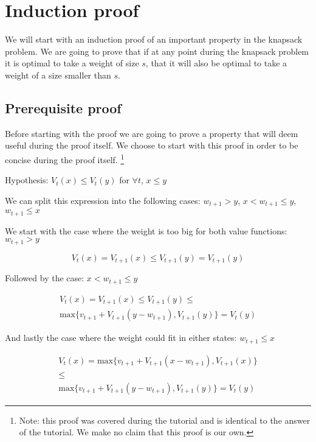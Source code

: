 \documentclass[nonacm,sigconf]{acmart}
\begin{document}
\section{Induction proof}

We will start with an induction proof of an important property
in the knapsack problem. We are going to prove that if at any
point during the knapsack problem it is optimal to take a weight
of size $s$, that it will also be optimal to take a weight of a
size smaller than $s$.

\subsection{Prerequisite proof}

Before starting with the proof we are going to prove a property that will deem
useful during the proof itself. We choose to start with this proof in order to
be concise during the proof itself. \footnote{Note: this proof was covered during the
tutorial and is identical to the answer of the tutorial. We make no claim that
this proof is our own.}

Hypothesis: $ V_{t}(x) \leq V_{t}(y) $ for $\forall t$, $ x \leq y $

We can split this expression into the following cases:
$ w_{t+1} > y $, $ x < w_{t+1} \leq y $, $ w_{t+1} \leq x $

We start with the case where the weight is too big for both value functions: $ w_{t+1} > y $

\begin{equation}
    V_t(x) = V_{t+1}(x) \leq V_{t+1}(y) = V_{t+1}(y)
\end{equation}

Followed by the case: $ x < w_{t+1} \leq {y} $

\begin{gather*}
    V_t(x) = V_{t+1}(x) \leq V_{t+1}(y) \leq \\
    \text{max} \{v_{t+1} + V_{t+1}(y -
        w_{t+1}), V_{t+1}(y) \} = V_t(y)
\end{gather*}

And lastly the case where the weight could fit in either states: $ w_{t+1} \leq x $

\begin{gather*}
    V_t(x) = \text{max}\{v_{t+1} + V_{t+1}(x - w_{t+1}), V_{t+1}(x)\} \\
    \le \\
    \text{max}\{v_{t+1} + V_{t+1}(y - w_{t+1}), V_{t+1}(y)\} = V_t(y)
\end{gather*}
\end{document}
